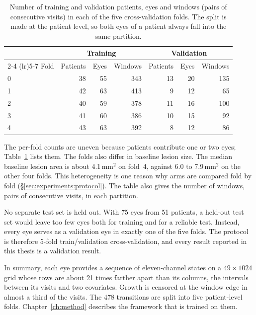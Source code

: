 \begin{table}[h]
  \centering
  \caption[Patients and eyes per cross-validation fold.]{%
    Number of training and validation patients, eyes and windows (pairs of
    consecutive visits) in each of the five cross-validation folds. The
    split is made at the patient level, so both eyes of a patient always
    fall into the same partition.}
  \label{tab:data:splits}
  \begin{tabular}{lrrrrrr}
    \toprule
    & \multicolumn{3}{c}{Training} & \multicolumn{3}{c}{Validation} \\
    \cmidrule(lr){2-4} \cmidrule(lr){5-7}
    Fold & Patients & Eyes & Windows & Patients & Eyes & Windows \\
    \midrule
    0 & 38 & 55 & 343 & 13 & 20 & 135 \\
    1 & 42 & 63 & 413 &  9 & 12 &  65 \\
    2 & 40 & 59 & 378 & 11 & 16 & 100 \\
    3 & 41 & 60 & 386 & 10 & 15 &  92 \\
    4 & 43 & 63 & 392 &  8 & 12 &  86 \\
    \bottomrule
  \end{tabular}
\end{table}

The per-fold counts are uneven because patients contribute one or two
eyes; Table~\ref{tab:data:splits} lists them. The folds also differ in
baseline lesion size. The median baseline lesion area is about
4.1\,mm$^2$ on fold~4, against 6.0 to 7.9\,mm$^2$ on the other four folds.
This heterogeneity is one reason why arms are compared fold by fold
(\S\ref{sec:experiments:protocol}). The table also gives the number of
windows, pairs of consecutive visits, in each partition.

No separate test set is held out. With 75 eyes from 51 patients, a
held-out test set would leave too few eyes both for training and for a
reliable test. Instead, every eye serves as a validation eye in exactly
one of the five folds. The protocol is therefore 5-fold train/validation
cross-validation, and every result reported in this thesis is a
validation result.

In summary, each eye provides a sequence of eleven-channel states on a
$49 \times 1024$ grid whose rows are about 21 times farther apart than its
columns, the intervals between its visits and two covariates. Growth is
censored at the window edge in almost a third of the visits. The 478
transitions are split into five patient-level folds.
Chapter~\ref{ch:method} describes the framework that is trained on them.


